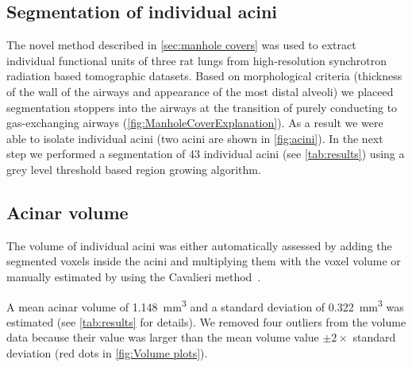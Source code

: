 \documentclass[paper=a4,DIV=calc,abstract,english]{scrartcl}
\newcommand{\numberofacini}{43\xspace}
\newcommand{\biggerthan}{2\xspace} %
\newcommand{\meanacinarvolume}{1.148} %
\newcommand{\meanacinarvolumeSTD}{0.322} %
\begin{document}
\subsection{Segmentation of individual acini}
The novel method described in \autoref{sec:manhole covers} was used to extract individual functional units of three rat lungs from high-resolution synchrotron radiation based tomographic datasets.
Based on morphological criteria (thickness of the wall of the airways and appearance of the most distal alveoli) we placeed segmentation stoppers into the airways at the transition of purely conducting to gas-exchanging airways (\autoref{fig:ManholeCoverExplanation}).
As a result we were able to isolate individual acini (two acini are shown in \autoref{fig:acini}).
%
In the next step we performed a segmentation of \numberofacini individual acini (see \autoref{tab:results}) using a grey level threshold based region growing algorithm.



\subsection{Acinar volume}
The volume of individual acini was either automatically assessed by adding the segmented voxels inside the acini and multiplying them with the voxel volume or manually estimated by using the Cavalieri method~\citep{Cruz-Orive1999}.

A mean acinar volume of \SI{\meanacinarvolume}{\milli\meter\cubed} and a standard deviation of \SI{\meanacinarvolumeSTD}{\milli\meter\cubed} was estimated (see \autoref{tab:results} for details).
We removed four outliers from the volume data because their value was larger than the mean volume value \(\pm\biggerthan\times\) standard deviation (red dots in \autoref{fig:Volume plots}).
\end{document}
